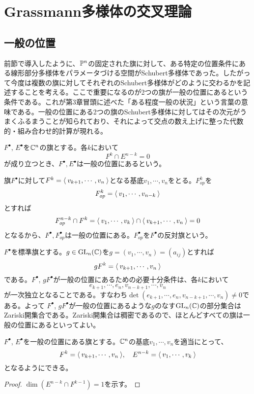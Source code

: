 \documentclass{ltjsreport}
\begin{document}
\section{Grassmann多様体の交叉理論}
\subsection{一般の位置}

前節で導入したように、$\mathbb{P}^n$の固定された旗に対して、ある特定の位置条件にある線形部分多様体をパラメータづける空間がSchubert多様体であった。したがって今度は複数の旗に対してそれぞれのSchubert多様体がどのように交わるかを記述することを考える。ここで重要になるのが2つの旗が一般の位置にあるという条件である。これが第3章冒頭に述べた「ある程度一般の状況」という言葉の意味である。一般の位置にある2つの旗のSchubert多様体に対してはその次元がうまくふるまうことが知られており、それによって交点の数え上げに整った代数的・組み合わせ的計算が現れる。

\begin{defin}
  $F^\bullet$, $E^\bullet$を$\mathbb{C}^n$の旗とする。各$k$において
  \[
  F^k\cap E^{n-k}=0  
  \]
  が成り立つとき、$F^\bullet,E^\bullet$は一般の位置にあるという。
\end{defin}

\begin{eg}
  旗$F^\bullet$に対して$F^k=\langle\:v_{k+1},\cdots,v_n\:\rangle$となる基底$v_1,\cdots,v_n$をとる。$F^k_{op}$を
  \[
  F^k_{op}=\langle\:v_1,\cdots,v_{n-k}\:\rangle  
  \]
  とすれば
  \[
  F^{n-k}_{op}\cap F^k=\langle\:v_1,\cdots,v_k\:\rangle\cap\langle\:v_{k+1},\cdots,v_n\:\rangle  =0
  \]
  となるから、$F^\bullet,F^\bullet_{op}$は一般の位置にある。$F^\bullet_{op}$を$F^\bullet$の反対旗という。
\end{eg}

\begin{eg}
  $F^\bullet$を標準旗とする。$g\in \text{GL}_n(\mathbb{C})$を$g=(v_1,\cdots,v_n)=(a_{ij})$とすれば
  \[
  gF^k=\langle\:v_{k+1},\cdots,v_n\:\rangle
  \]
  である。$F^\bullet$, $gF^\bullet$が一般の位置にあるための必要十分条件は、各$k$において
  \[
  e_{k+1},\cdots,e_n,v_{n-k+1},\cdots,v_n  
  \]
  が一次独立となることである。すなわち$\det(e_{k+1},\cdots,e_n,v_{n-k+1},\cdots,v_n)\neq 0$である。よって
  $F^\bullet$, $gF^\bullet$が一般の位置にあるような$g$のなす$\text{GL}_n(\mathbb{C})$の部分集合はZariski開集合である。Zariski開集合は稠密であるので、ほとんどすべての旗は一般の位置にあるといってよい。
\end{eg}

\begin{prop}
  $F^\bullet$, $E^\bullet$を一般の位置にある旗とする。$\mathbb{C}^n$の基底$v_1,\cdots,v_n$を適当にとって、
  \[
  F^k=\langle\:v_{k+1},\cdots,v_n\:\rangle, \quad E^{n-k}=\langle\:v_1,\cdots,v_k\:\rangle  
  \]
  となるようにできる。
\end{prop}

\begin{proof}
  $\dim (E^{n-k}\cap F^{k-1})=1$を示す。
\end{proof}
\end{document}
